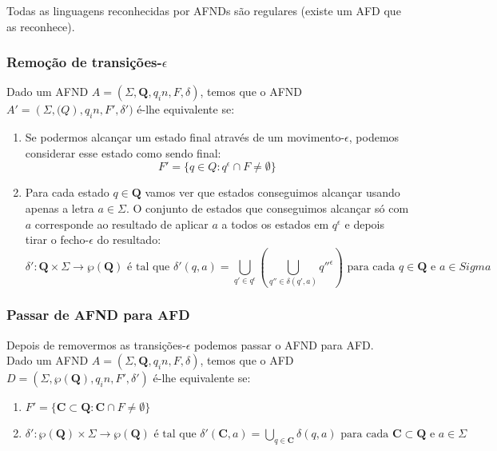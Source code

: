 \documentclass{article}
\begin{document}
Todas as linguagens reconhecidas por AFNDs são regulares (existe um AFD que as reconhece).

\subsubsection{Remoção de transições-$\epsilon$}

Dado um AFND $A = (\Sigma, \mathbf{Q}, q_in, F, \delta)$, temos que o AFND $A' = (\Sigma, \mathbf(Q), q_in, F', \delta')$ é-lhe equivalente se:

\begin{enumerate}
    \item Se podermos alcançar um estado final através de um movimento-$\epsilon$, podemos considerar esse estado como sendo final: $$ F' = \{q \in Q : q^\epsilon \cap F \neq \emptyset\} $$
    \item Para cada estado $q \in \mathbf{Q}$ vamos ver que estados conseguimos alcançar usando apenas a letra $a \in \Sigma$. O conjunto de estados que conseguimos alcançar só com $a$ corresponde ao resultado de aplicar $a$ a todos os estados em $q^\epsilon$ e depois tirar o fecho-$\epsilon$ do resultado: $$ \delta' : \mathbf{Q} \times \Sigma \to \wp(\mathbf{Q}) \text{ é tal que } \delta'(q,a) = \bigcup_{q' \in q^\epsilon}(\bigcup_{q'' \in \delta(q', a)}q''^\epsilon) \text{ para cada } q \in \mathbf{Q} \text{ e } a \in Sigma $$
\end{enumerate}

\subsubsection{Passar de AFND para AFD}

Depois de removermos as transições-$\epsilon$ podemos passar o AFND para AFD. \\
Dado um AFND $A = (\Sigma, \mathbf{Q}, q_in, F, \delta)$, temos que o AFD $D = (\Sigma, \wp(\mathbf{Q}), q_in, F', \delta')$ é-lhe equivalente se:

\begin{enumerate}
    \item $F' = \{\mathbf{C} \subset \mathbf{Q} : \mathbf{C} \cap F \neq \emptyset\}$
    \item $\delta' : \wp(\mathbf{Q}) \times \Sigma \to \wp(\mathbf{Q}) \text{ é tal que } \delta'(\mathbf{C}, a) = \bigcup_{q \in \mathbf{C}}\delta(q,a) \text{ para cada } \mathbf{C} \subset \mathbf{Q} \text{ e } a \in \Sigma$
\end{enumerate}
\end{document}
